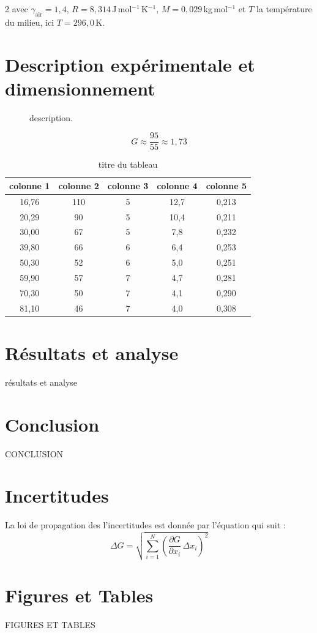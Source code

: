﻿\documentclass[a4paper,10pt]{article}
\begin{document}
\begin{multicols*}{2}
avec $\gamma_{\mathrm{air}} = 1{,}4$, $R = 8{,}314$\,J\,mol$^{-1}$\,K$^{-1}$, $M = 0{,}029$\,kg\,mol$^{-1}$ et $T$ la température du milieu, ici $T = 296{,}0$\,K.


\section{Description expérimentale et dimensionnement}
\begin{figure}[H]
\centering
\caption{description.}
\label{fig:image}
\end{figure}
\begin{equation}
    G \approx \frac{95}{55} \approx 1{,}73
\end{equation}

\begin{table}[H]
\centering
\caption{titre du tableau}
\label{tab:cuve}
\begin{tabular}{ccccc}
\toprule
colonne 1 & colonne 2 & colonne 3 & colonne 4 & colonne 5 \\
\midrule
16{,}76 & 110 & 5 & 12{,}7 & 0{,}213 \\
20{,}29 &  90 & 5 & 10{,}4 & 0{,}211 \\
30{,}00 &  67 & 5 & 7{,}8 & 0{,}232 \\
39{,}80 &  66 & 6 & 6{,}4 & 0{,}253 \\
50{,}30 &  52 & 6 &  5{,}0 & 0{,}251 \\
59{,}90 &  57 & 7 &  4{,}7 & 0{,}281 \\
70{,}30 &  50 & 7 &  4{,}1 & 0{,}290 \\
81{,}10 &  46 & 7 &  4{,}0 & 0{,}308 \\
\bottomrule
\end{tabular}
\end{table}

\section{Résultats et analyse}
résultats et analyse

\section{Conclusion}
CONCLUSION
\end{multicols*}


\appendix
\section{Incertitudes}
La loi de propagation des l’incertitudes est donnée par l’équation qui suit :
\begin{equation}
\Delta G = \sqrt{\sum_{i=1}^{N} \left( \frac{\partial G}{\partial x_i}\,\Delta x_i \right)^2}
\end{equation}



\section{Figures et Tables}



FIGURES ET TABLES
\end{document}
